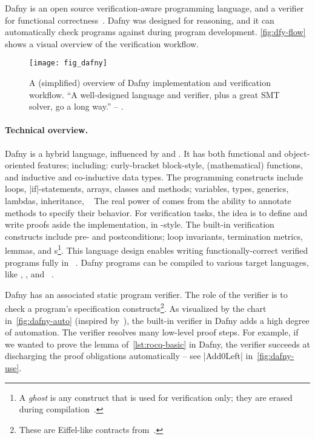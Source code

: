 Dafny is an open source verification-aware programming language, and a verifier for functional correctness~\cite{leino2010,dafnylang}.
Dafny was designed for reasoning, and it can automatically check programs against  during program development.
\autoref{fig:dfy-flow} shows a visual overview of the verification workflow.

\begin{figure}[ht]
\centering
\texttt{[image: fig\_dafny]}
\caption[Overview of Dafny implementation and verification workflow]{
A (simplified) overview of Dafny implementation and verification workflow.
\enquote{A well-designed language and verifier, plus a great SMT solver, go a long way.} -- \textcite{leino2010b}.}
\label{fig:dfy-flow}
\end{figure}

\paragraph*{Technical overview.}
Dafny is a hybrid language, influenced by  and .
It has both functional and object-oriented features;
including: curly-bracket block-style, (mathematical) functions, and inductive and co-inductive data types.
The programming constructs include loops, \pr|if|-statements, arrays, classes and methods;
variables, types, generics, lambdas, inheritance, \etc~\cite{dafnydoc}
The real power of  comes from the ability to annotate methods to specify their behavior.
For verification tasks, the idea is to define  and write proofs aside the implementation, in -style.
The built-in verification constructs include pre- and postconditions;
loop invariants, termination metrics, lemmas, and s\footnote{
A \emph{ghost} is any construct that is used for verification only; they are erased during compilation~\cite[p. 19]{leino2023}.}.
This language design enables writing functionally-correct verified programs fully in ~\cite{leino2023}.
Dafny programs can be compiled to various target languages, like , , and ~\cite{dafnydoc}.

Dafny has an associated static program verifier.
The role of the verifier is to check a program's specification constructs\footnote{These are Eiffel-like contracts from~\cite{meyer1988}.}.
As visualized by the chart in~\autoref{fig:dafny-auto} (inspired by~\cite{leino2010b}), the built-in verifier in Dafny adds a high degree of automation.
The verifier resolves many low-level proof steps.
For example, if we wanted to prove the lemma of~\autoref{lst:rocq-basic} in Dafny, the verifier succeeds at discharging the proof obligations automatically -- see \pr|Add0Left| in~\autoref{fig:dafny-use}.

